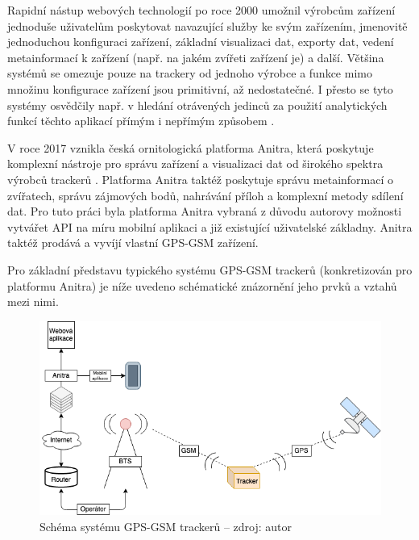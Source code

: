 Rapidní nástup webových technologií po roce 2000 umožnil výrobcům zařízení jednoduše uživatelům poskytovat navazující služby ke svým zařízením, jmenovitě jednoduchou konfiguraci zařízení, základní visualizaci dat, exporty dat, vedení metainformací k zařízení (např. na jakém zvířeti zařízení je) a další. Většina systémů se omezuje pouze na trackery od jednoho výrobce a funkce mimo množinu konfigurace zařízení jsou primitivní, až nedostatečné. I přesto se tyto systémy osvědčily např. v hledání otrávených jedinců za použití analytických funkcí těchto aplikací přímým i nepřímým způsobem \cite{stoynov2018early}.

V roce 2017 vznikla česká ornitologická platforma Anitra, která poskytuje komplexní nástroje pro správu zařízení a visualizaci dat od širokého spektra výrobců trackerů \cite{krouzkovaniPtakuAnitra}. Platforma Anitra taktéž poskytuje správu metainformací o zvířatech, správu zájmových bodů, nahrávání příloh a komplexní metody sdílení dat. Pro tuto práci byla platforma Anitra vybraná z důvodu autorovy možnosti vytvářet API na míru mobilní aplikaci a již existující uživatelské základny. Anitra taktéž prodává a vyvíjí vlastní GPS-GSM zařízení.

Pro základní představu typického systému GPS-GSM trackerů (konkretizován pro platformu Anitra) je níže uvedeno schématické znázornění jeho prvků a vztahů mezi nimi.

\begin{figure}[h]
	\includegraphics[width=\linewidth]{img/diagram_system.png}
	\caption[Schéma systému GPS-GSM trackerů]{Schéma systému GPS-GSM trackerů -- zdroj: autor}
	\label{fig:boat1}
\end{figure}